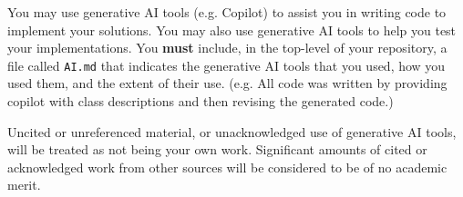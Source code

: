 \documentclass{csse4400}
\begin{document}
You may use generative AI tools (e.g. Copilot) to assist you in writing code to implement your solutions. You may also use generative AI tools to help you test your implementations. You \textbf{must} include, in the top-level of your repository, a file called \texttt{AI.md} that indicates the generative AI tools that you used, how you used them, and the extent of their use. (e.g. All code was written by providing copilot with class descriptions and then revising the generated code.)

Uncited or unreferenced material, or unacknowledged use of generative AI tools, will be treated as not being your own work. Significant amounts of cited or acknowledged work from other sources will be considered to be of no academic merit.





\end{document}
